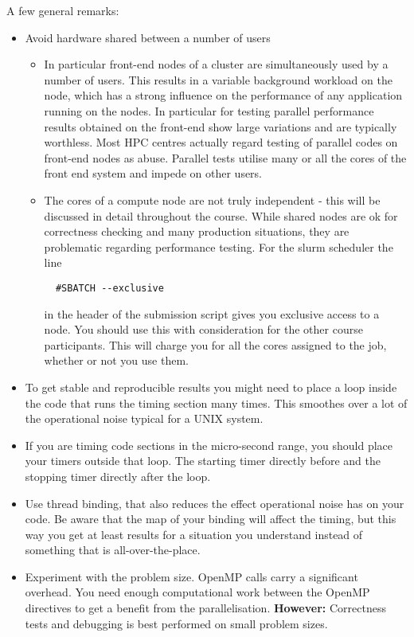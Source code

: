 \documentclass[a4paper,oneside,12pt]{article}
\begin{document}
A few general remarks:
\begin{itemize}
\item Avoid hardware shared between a number of users  
\begin{itemize}
\item In particular front-end nodes of a cluster are simultaneously used by a number of users.  This results in a variable background workload on the node, which has a strong influence on the performance of any application running on the nodes.  In particular for testing parallel performance results obtained on the front-end show large variations and are typically worthless.  Most HPC centres actually regard testing of parallel codes on front-end nodes as abuse.  Parallel tests utilise many or all the cores of the front end system and impede on other users.
\item The cores of a compute node are not truly independent - this will be discussed in detail throughout the course.  While shared nodes are ok for correctness checking and many production situations, they are problematic regarding performance testing.  For the slurm scheduler the line
\begin{verbatim}
  #SBATCH --exclusive
\end{verbatim}
in the header of the submission script gives you exclusive access to a node.  You should use this with consideration for the other course participants.  This will charge you for all the cores assigned to the job, whether or not you use them.
\end{itemize}
\item To get stable and reproducible results you might need to place a loop inside the code that runs the timing section many times.  This smoothes over a lot of the operational noise typical for a UNIX system.  

\item If you are timing code sections in the micro-second range, you should place your timers outside that loop.  The starting timer directly before and the stopping timer directly after the loop. 
\item Use thread binding, that also reduces the effect operational noise has on your code.  Be aware that the map of your binding will affect the timing, but this way you get at least results for a situation you understand instead of something that is all-over-the-place.
\item Experiment with the problem size.  OpenMP calls carry a significant overhead.  You need enough computational work between the OpenMP directives to get a benefit from the parallelisation. \textbf{However:} Correctness tests and debugging is best performed on small problem sizes.
\end{itemize}
\end{document}
